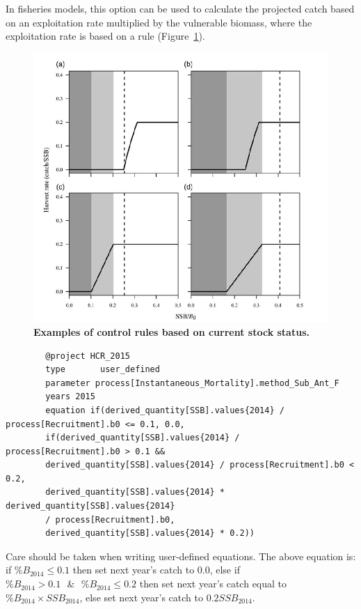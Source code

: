 In fisheries models, this option can be used to calculate the projected catch based on an exploitation rate multiplied by the vulnerable biomass, where the exploitation rate is based on a rule (Figure~\ref{fig:HCR}).

\begin{figure}[!h]
	\includegraphics[scale=0.9]{Figures/HarvestControlRules.png}
	\caption{\textbf{Examples of control rules based on current stock status.}}
	\label{fig:HCR}
\end{figure}

\pagebreak
{\small{\begin{verbatim}
		@project HCR_2015
		type       user_defined
		parameter process[Instantaneous_Mortality].method_Sub_Ant_F
		years 2015
		equation if(derived_quantity[SSB].values{2014} / process[Recruitment].b0 <= 0.1, 0.0,
		if(derived_quantity[SSB].values{2014} / process[Recruitment].b0 > 0.1 &&
		derived_quantity[SSB].values{2014} / process[Recruitment].b0 < 0.2,
		derived_quantity[SSB].values{2014} * derived_quantity[SSB].values{2014}
		/ process[Recruitment].b0,
		derived_quantity[SSB].values{2014} * 0.2))
		\end{verbatim}}}

Care should be taken when writing user-defined equations. The above equation is: if $\%B_{2014} \leq 0.1$ then set next year's catch to 0.0, else if $\%B_{2014} > 0.1 \text{ } \& \text{ } \%B_{2014} \leq 0.2$ then set next year's catch equal to $\%B_{2014} \times SSB_{2014}$, else set next year's catch to $0.2 SSB_{2014}$.

